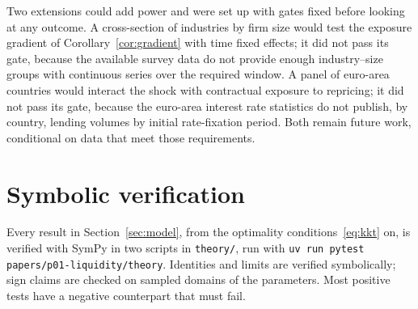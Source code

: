 \documentclass[11pt]{article}
\theoremstyle{remark}
\begin{document}
Two extensions could add power and were set up with gates fixed before looking at any outcome. A cross-section of industries by
firm size would test the exposure gradient of Corollary~\ref{cor:gradient} with time fixed effects; it did not pass its gate,
because the available survey data do not provide enough industry--size groups with continuous series over the required window. A
panel of euro-area countries would interact the shock with contractual exposure to repricing; it did not pass its gate, because
the euro-area interest rate statistics do not publish, by country, lending volumes by initial rate-fixation period. Both remain
future work, conditional on data that meet those requirements.




\appendix
\section{Symbolic verification}\label{app:verification}

Every result in Section~\ref{sec:model}, from the optimality conditions~\eqref{eq:kkt} on, is verified with SymPy in two scripts in \texttt{theory/}, run with
\texttt{uv run pytest papers/p01-liquidity/theory}. Identities and limits are verified symbolically; sign claims are checked on
sampled domains of the parameters. Most positive tests have a negative counterpart that must fail.
\end{document}
